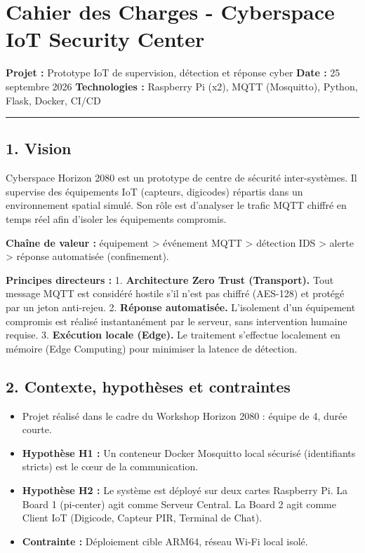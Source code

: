 \documentclass[
]{article}
\author{}
\date{}
\providecommand{\tightlist}{%
  \setlength{\itemsep}{0pt}\setlength{\parskip}{0pt}}
\begin{document}
\section{Cahier des Charges - Cyberspace IoT Security
Center}\label{cahier-des-charges---cyberspace-iot-security-center}

\textbf{Projet :} Prototype IoT de supervision, détection et réponse
cyber \textbf{Date :} 25 septembre 2026 \textbf{Technologies :}
Raspberry Pi (x2), MQTT (Mosquitto), Python, Flask, Docker, CI/CD

\begin{center}\rule{0.5\linewidth}{0.5pt}\end{center}

\subsection{1. Vision}\label{vision}

Cyberspace Horizon 2080 est un prototype de centre de sécurité
inter-systèmes. Il supervise des équipements IoT (capteurs, digicodes)
répartis dans un environnement spatial simulé. Son rôle est d'analyser
le trafic MQTT chiffré en temps réel afin d'isoler les équipements
compromis.

\textbf{Chaîne de valeur :} équipement \textgreater{} événement MQTT
\textgreater{} détection IDS \textgreater{} alerte \textgreater{}
réponse automatisée (confinement).

\textbf{Principes directeurs :} 1. \textbf{Architecture Zero Trust
(Transport).} Tout message MQTT est considéré hostile s'il n'est pas
chiffré (AES-128) et protégé par un jeton anti-rejeu. 2. \textbf{Réponse
automatisée.} L'isolement d'un équipement compromis est réalisé
instantanément par le serveur, sans intervention humaine requise. 3.
\textbf{Exécution locale (Edge).} Le traitement s'effectue localement en
mémoire (Edge Computing) pour minimiser la latence de détection.

\subsection{2. Contexte, hypothèses et
contraintes}\label{contexte-hypothuxe8ses-et-contraintes}

\begin{itemize}
\tightlist
\item
  Projet réalisé dans le cadre du Workshop Horizon 2080 : équipe de 4,
  durée courte.
\item
  \textbf{Hypothèse H1 :} Un conteneur Docker Mosquitto local sécurisé
  (identifiants stricts) est le cœur de la communication.
\item
  \textbf{Hypothèse H2 :} Le système est déployé sur deux cartes
  Raspberry Pi. La Board 1 (pi-center) agit comme Serveur Central. La
  Board 2 agit comme Client IoT (Digicode, Capteur PIR, Terminal de
  Chat).
\item
  \textbf{Contrainte :} Déploiement cible ARM64, réseau Wi-Fi local
  isolé.
\end{itemize}
\end{document}
